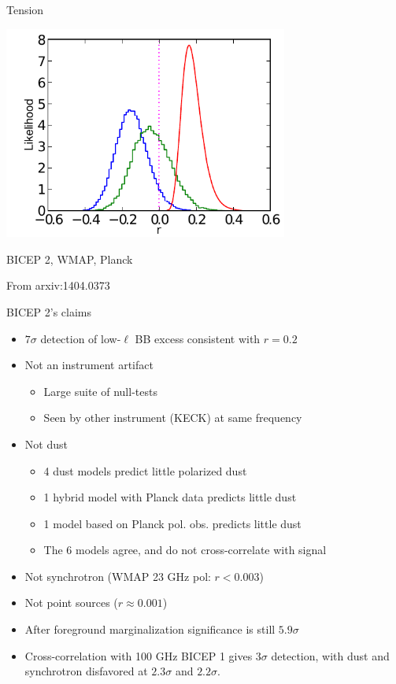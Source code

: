 \documentclass{beamer}
\begin{document}
\begin{frame}{Tension}
	\begin{center}
		\includegraphics[height=7cm]{tension.pdf}

		{\color{red}BICEP 2}, {\color[rgb]{0,0.5,0}WMAP}, {\color{blue}Planck}

		{\footnotesize From arxiv:1404.0373}
	\end{center}
\end{frame}

\begin{frame}{BICEP 2's claims}
	\begin{itemize}
		\item<2-> $7\sigma$ detection of low-$\ell$ BB excess consistent with $r=0.2$
		\item<3-> Not an instrument artifact
			\begin{itemize}
				\item<4-> Large suite of null-tests
				\item<5-> Seen by other instrument (KECK) at same frequency
			\end{itemize}
		\item<6-> Not dust
			\begin{itemize}
				\item<7-> 4 dust models predict little polarized dust
				\item<8-> 1 hybrid model with Planck data predicts little dust
				\item<9-> 1 model based on Planck pol. obs. predicts little dust
				\item<10-> The 6 models agree, and do not cross-correlate with signal
			\end{itemize}
		\item<11-> Not synchrotron (WMAP 23 GHz pol: $r<0.003$)
		\item<12-> Not point sources ($r\approx0.001$)
		\item<13-> After foreground marginalization significance is still $5.9\sigma$
		\item<14-> Cross-correlation with 100 GHz BICEP 1 gives $3\sigma$ detection,
			with dust and synchrotron disfavored at $2.3\sigma$ and $2.2\sigma$.
	\end{itemize}
\end{frame}
\end{document}
